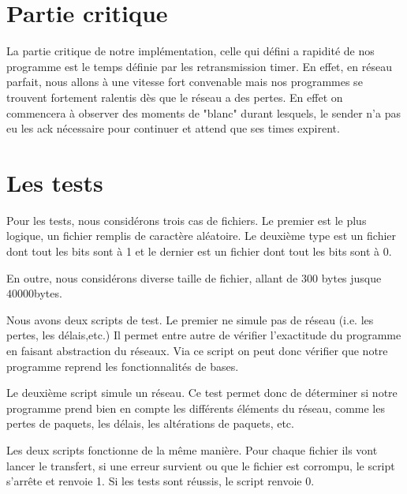 \documentclass[12pt,notitlepage]{report}
\begin{document}
\section{Partie critique}
	La partie critique de notre implémentation, celle qui défini a rapidité de nos programme est le temps définie par les retransmission timer. En effet, en réseau parfait, nous allons à une vitesse fort convenable mais nos programmes se trouvent fortement ralentis dès que le réseau a des pertes. En effet on commencera à observer des moments de "blanc" durant lesquels, le sender n'a pas eu les ack nécessaire pour continuer et attend que ses times expirent.

\section{Les tests}
	Pour les tests, nous considérons trois cas de fichiers. Le premier est le plus logique, un fichier remplis de caractère aléatoire. Le deuxième type est un fichier dont tout les bits sont à 1 et le dernier est un fichier dont tout les bits sont à 0.
	
	En outre, nous considérons diverse taille de fichier, allant de $300$ bytes jusque $40 000$bytes. 
	
	Nous avons deux scripts de test. Le premier ne simule pas de réseau (i.e. les pertes, les délais,etc.) Il permet entre autre de vérifier l'exactitude du programme en faisant abstraction du réseaux. Via ce script on peut donc vérifier que notre programme reprend les fonctionnalités de bases.
	
	Le deuxième script simule un réseau. Ce test permet donc de déterminer si notre programme prend bien en compte les différents éléments du réseau, comme les pertes de paquets, les délais, les altérations de paquets, etc.
	
	Les deux scripts fonctionne de la même manière. Pour chaque fichier ils vont lancer le transfert, si une erreur survient ou que le fichier est corrompu, le script s'arrête et renvoie 1. Si les tests sont réussis, le script renvoie 0.
\end{document}
